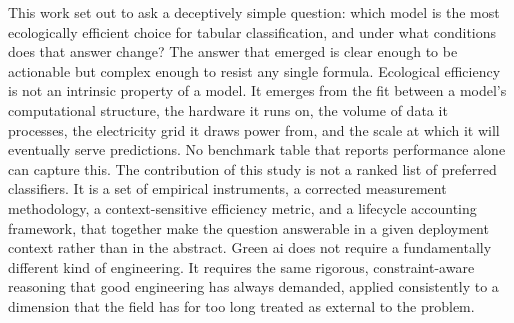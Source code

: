 This work set out to ask a deceptively simple question: which model is the most ecologically efficient choice for tabular classification, and under what conditions does that answer change? The answer that emerged is clear enough to be actionable but complex enough to resist any single formula. Ecological efficiency is not an intrinsic property of a model. It emerges from the fit between a model's computational structure, the hardware it runs on, the volume of data it processes, the electricity grid it draws power from, and the scale at which it will eventually serve predictions. No benchmark table that reports performance alone can capture this. The contribution of this study is not a ranked list of preferred classifiers. It is a set of empirical instruments, a corrected measurement methodology, a context-sensitive efficiency metric, and a lifecycle accounting framework, that together make the question answerable in a given deployment context rather than in the abstract. Green \gls{ai} does not require a fundamentally different kind of engineering. It requires the same rigorous, constraint-aware reasoning that good engineering has always demanded, applied consistently to a dimension that the field has for too long treated as external to the problem.